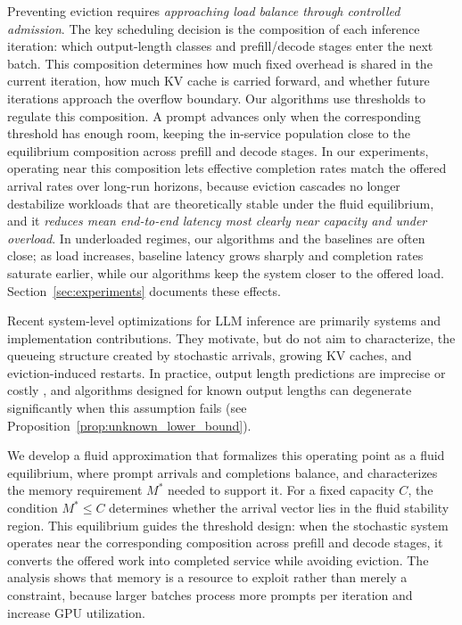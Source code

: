 Preventing eviction requires \emph{approaching load balance through controlled admission}. The key scheduling decision is the composition of each inference iteration: which output-length classes and prefill/decode stages enter the next batch. This composition determines how much fixed overhead is shared in the current iteration, how much KV cache is carried forward, and whether future iterations approach the overflow boundary. Our algorithms use thresholds to regulate this composition. A prompt advances only when the corresponding threshold has enough room, keeping the in-service population close to the equilibrium composition across prefill and decode stages. In our experiments, operating near this composition lets effective completion rates match the offered arrival rates over long-run horizons, because eviction cascades no longer destabilize workloads that are theoretically stable under the fluid equilibrium, and it \emph{reduces mean end-to-end latency most clearly near capacity and under overload}. In underloaded regimes, our algorithms and the baselines are often close; as load increases, baseline latency grows sharply and completion rates saturate earlier, while our algorithms keep the system closer to the offered load. Section~\ref{sec:experiments} documents these effects.

Recent system-level optimizations for LLM inference \citep{yu2022orca, kwon2023efficient, agrawal2023sarathi, pope2023efficiently, deepseekai2024deepseekv2strongeconomicalefficient, patel2024splitwise, zhong2024distserve} are primarily systems and implementation contributions. They motivate, but do not aim to characterize, the queueing structure created by stochastic arrivals, growing KV caches, and eviction-induced restarts. In practice, output length predictions are imprecise or costly \citep{fu2025efficient}, and algorithms designed for known output lengths can degenerate significantly when this assumption fails (see Proposition~\ref{prop:unknown_lower_bound}).

We develop a fluid approximation that formalizes this operating point as a fluid equilibrium, where prompt arrivals and completions balance, and characterizes the memory requirement \(M^*\) needed to support it. For a fixed capacity \(C\), the condition \(M^*\le C\) determines whether the arrival vector lies in the fluid stability region. This equilibrium guides the threshold design: when the stochastic system operates near the corresponding composition across prefill and decode stages, it converts the offered work into completed service while avoiding eviction. The analysis shows that memory is a resource to exploit rather than merely a constraint, because larger batches process more prompts per iteration and increase GPU utilization.

